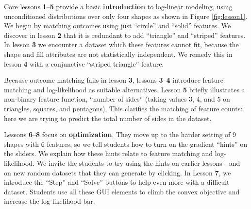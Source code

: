 \documentclass[11pt,letterpaper]{article}
\newcommand{\les}[1]{\textbf{#1}}
\begin{document}
Core lessons \les{1}--\les{5} provide a basic
\textbf{introduction} to log-linear modeling, using unconditioned
distributions over only four shapes as shown in Figure
\ref{fig:lesson1}.  We begin by matching outcomes using just
``circle'' and ``solid'' features.  We discover in lesson \les{2}
that it is redundant to add ``triangle'' and ``striped'' features.  In
lesson \les{3} we encounter a dataset which these features cannot
fit, because the shape and fill attributes are not statistically
independent.  We remedy this in lesson \les{4} with a conjunctive
``striped triangle'' feature.  

Because outcome matching fails in lesson \les{3}, lessons
\les{3}--\les{4} introduce feature matching and log-likelihood
as suitable alternatives.  Lesson \les{5} briefly illustrates a
non-binary feature function, ``number of sides'' (taking values 3, 4,
and 5 on triangles, squares, and pentagons).  This clarifies the
matching of feature counts: here we are trying to predict the total
number of sides in the dataset.



Lessons \les{6}--\les{8} focus on \textbf{optimization}.  They
move up to the harder setting of 9 shapes with 6 features, so we tell
students how to turn on the gradient ``hints'' on the sliders.  We
explain how these hints relate to feature matching and log-likelihood.
We invite the students to try using the hints on earlier lessons---and
on new random datasets that they can generate by clicking.  In Lesson
\les{7}, we introduce the ``Step'' and ``Solve'' buttons to help
even more with a difficult dataset.  Students use all these GUI
elements to climb the convex objective and increase the log-likelihood
bar.
\end{document}
